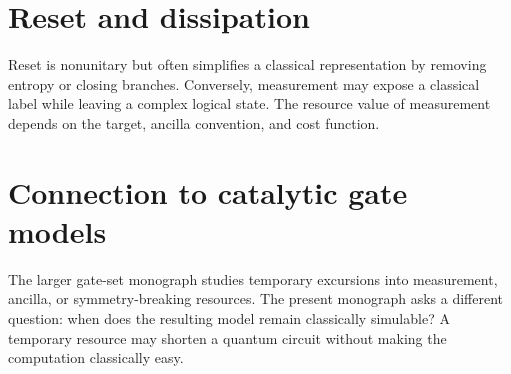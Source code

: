 \section{Reset and dissipation}
Reset is nonunitary but often simplifies a classical representation by removing entropy or closing branches. Conversely, measurement may expose a classical label while leaving a complex logical state. The resource value of measurement depends on the target, ancilla convention, and cost function.

\section{Connection to catalytic gate models}
The larger gate-set monograph studies temporary excursions into measurement, ancilla, or symmetry-breaking resources. The present monograph asks a different question: when does the resulting model remain classically simulable? A temporary resource may shorten a quantum circuit without making the computation classically easy.
